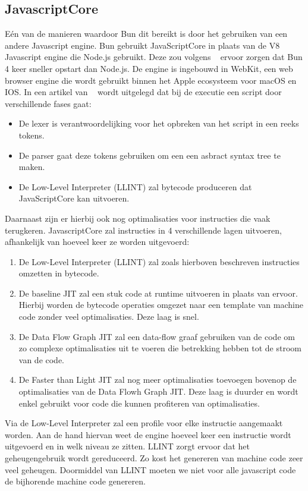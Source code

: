 \subsection{JavascriptCore}
Eén van de manieren waardoor Bun dit bereikt is door het gebruiken van een andere Javascript engine.
Bun gebruikt JavaScriptCore in plaats van de V8 Javascript engine die Node.js gebruikt. 
Deze zou volgens ~\textcite{McDonnel2023} ervoor zorgen dat Bun 4 keer sneller opstart dan Node.js. 
De engine is ingebouwd in WebKit, een web browser engine die wordt gebruikt binnen het Apple ecosysteem voor macOS en IOS.
In een artikel van ~\textcite{Pizlo2020} wordt uitgelegd dat bij de executie een script door verschillende fases gaat:
\begin{itemize}
    \item De lexer is verantwoordelijking voor het opbreken van het script in een reeks tokens.
    \item De parser gaat deze tokens gebruiken om een een asbract syntax tree te maken.
    \item De Low-Level Interpreter (LLINT) zal bytecode produceren dat JavaScriptCore kan uitvoeren.
\end{itemize}
Daarnaast zijn er hierbij ook nog optimalisaties voor instructies die vaak terugkeren. 
JavascriptCore zal instructies in 4 verschillende lagen uitvoeren, afhankelijk van hoeveel keer ze worden uitgevoerd:
\begin{enumerate}
    \item De Low-Level Interpreter (LLINT) zal zoals hierboven beschreven instructies omzetten in bytecode.
    \item De baseline JIT zal een stuk code at runtime uitvoeren in plaats van ervoor. 
    Hierbij worden de bytecode operaties omgezet naar een template van machine code zonder veel optimalisaties. Deze laag is snel.
    \item De Data Flow Graph JIT zal een data-flow graaf gebruiken van de code om zo complexe optimalisaties uit te voeren die betrekking hebben tot de stroom van de code.
    \item De Faster than Light JIT zal nog meer optimalisaties toevoegen bovenop de optimalisaties van de Data Flowh Graph JIT. 
    Deze laag is duurder en wordt enkel gebruikt voor code die kunnen profiteren van optimalisaties.
\end{enumerate}
Via de Low-Level Interpreter zal een profile voor elke instructie aangemaakt worden. 
Aan de hand hiervan weet de engine hoeveel keer een instructie wordt uitgevoerd en in welk niveau ze zitten.
LLINT zorgt ervoor dat het geheugengebruik wordt gereduceerd. Zo kost het genereren van machine code zeer veel geheugen.
Doormiddel van LLINT moeten we niet voor alle javascript code de bijhorende machine code genereren.